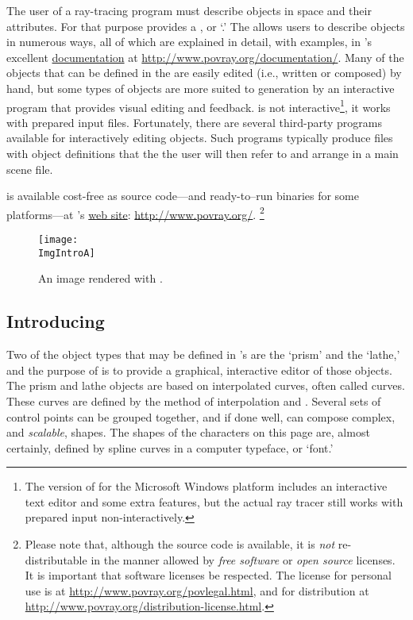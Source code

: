 The user of a ray-tracing program must describe objects in space
and their attributes. For that purpose \IXpov{} provides a
, or `.'
The 
allows users to describe objects in numerous ways, all of which
are explained in detail, with examples, in \IXpov{}'s
excellent \href{http://www.povray.org/documentation/}{documentation}
at \url{http://www.povray.org/documentation/}.
Many of the objects that can be defined in the  are easily
edited (i.e., written or composed) by hand, but some types of objects
are more suited to generation by an interactive program that
provides visual editing and feedback. \IXpov{} is not
interactive\footnote{The version of \IXpov{} for the
Microsoft Windows platform includes an interactive text editor and
some extra features, but the actual ray tracer still works
with prepared input non-interactively.},
it works with prepared input files. Fortunately, there are several
third-party programs available for interactively editing
\IXpov{}  objects. Such programs typically
produce  files with object definitions
that the the user will then refer to and arrange in a main scene file.

\IXpov{} is available cost-free as source code---and
ready-to--run binaries for some platforms---at
\IXpov's \href{http://www.povray.org/}{web site}:
\url{http://www.povray.org/}.
\footnote{Please note that, although the source code is available,
it is \emph{not} re-distributable in the manner allowed
by \emph{free software} or \emph{open source} licenses.
It is important that software licenses be respected.
The \IXpov{} license for personal use is at
\url{http://www.povray.org/povlegal.html}, and for distribution
at \url{http://www.povray.org/distribution-license.html}.}

\begin{figure}[htb]
\centering
\texttt{[image: \\ImgIntroA]}
\caption{An image rendered with \dtypov.}
\label{fig:pov_image_Intro_0}
\end{figure}


	\subsection{Introducing \dtypkgu}
Two of the object types that may be defined in \IXpov's
 are the `prism' and the `lathe,' and
the purpose of \IXpkg{} is to provide a graphical,
interactive editor of those objects. The prism and lathe
objects are based on interpolated curves, often called
 curves. These curves are defined by
the method of interpolation and .
Several sets of control points can be grouped together, and
if done well, can compose complex, and \emph{scalable},
shapes.
The shapes of the characters on this page are, almost certainly,
defined by spline curves in a computer typeface, or `font.'

